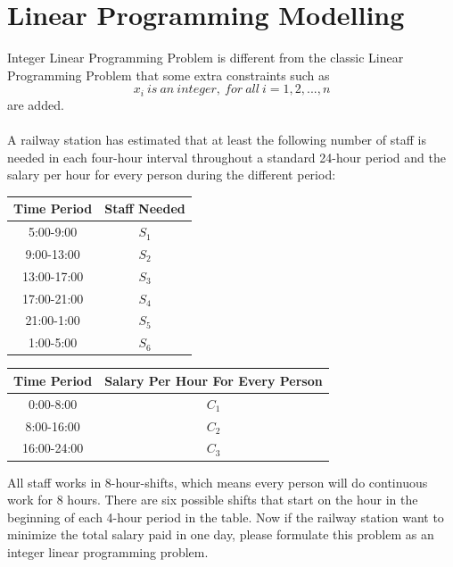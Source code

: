 \documentclass[a4paper,11pt]{article}
\begin{document}

\section{Linear Programming Modelling}
{\sc Integer Linear Programming Problem} is different from the classic Linear Programming Problem that some extra constraints such as 
$$x_i\ is\ an\ integer,\ for\ all\ i=1,2,...,n$$
are added.\\\\
A railway station has estimated that at least the following number of staff is needed in each four-hour interval throughout a standard 24-hour period and the salary per hour for every person during the different period:
\begin{center}
\begin{tabular}{c|c}
 Time Period & Staff Needed\\
\hline
5:00-9:00 & $S_1$\\
9:00-13:00 & $S_2$\\
13:00-17:00 & $S_3$\\
17:00-21:00 & $S_4$\\
21:00-1:00 & $S_5$\\
1:00-5:00 & $S_6$
\end{tabular}
\begin{tabular}{c|c}
 Time Period & Salary Per Hour For Every Person\\
\hline
0:00-8:00 & $C_1$\\
8:00-16:00 & $C_2$\\
16:00-24:00 & $C_3$
\end{tabular}
\end{center}
All staff works in 8-hour-shifts, which means every person will do continuous work for 8 hours. There are six possible shifts that start on the hour in the beginning of each 4-hour period in the table. Now if the railway station want to minimize the total salary paid in one day, please formulate this problem as an integer linear programming problem.
\end{document}
